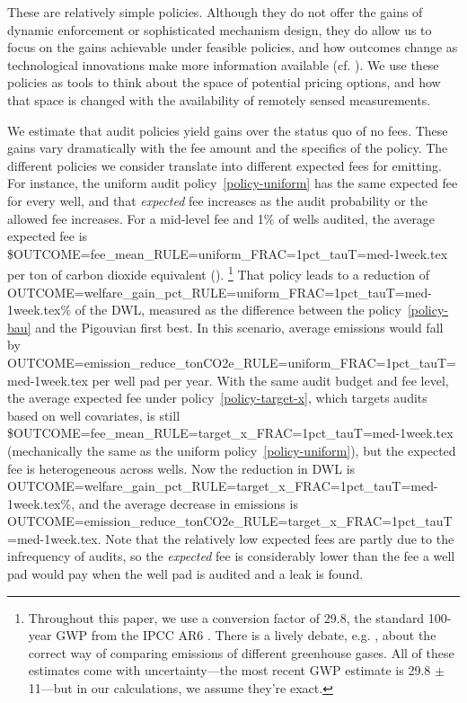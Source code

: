 \documentclass[12pt,oneside,letterpaper]{article}
\theoremstyle{definition}
\begin{document}
\begin{refsection}
These are relatively simple policies.
Although they do not offer the gains of dynamic enforcement or sophisticated mechanism design, they do allow us to focus on the gains achievable under
feasible policies, and how outcomes change as technological innovations make more information available
(cf.
\cite{%
Blundell/Gowrisankaran/Langer:2020,
Cicala/Hemous/Olsen:2019,
Oestreich:2017,
}).
We use these policies as tools to think about the space of potential pricing options, and how that space is changed with the availability of remotely sensed measurements.


We estimate that audit policies yield gains over the status quo of no fees.
These gains vary dramatically with the fee amount and the specifics of the policy.
The different policies we consider translate into different expected fees for emitting.
For instance, the uniform audit policy~\ref{policy-uniform} has the same expected fee for every well, and that \textit{expected} fee increases as the audit probability or the allowed fee increases.
For a mid-level fee and 1\% of wells audited, the average expected fee is
\${OUTCOME=fee_mean_RULE=uniform_FRAC=1pct_tauT=med-1week.tex} per ton of carbon dioxide equivalent ().%
\footnote{%
\label{fn:gwp}
Throughout this paper, we use a  conversion factor of 29.8, the standard 100-year \gls{GWP} from the \gls{IPCC} AR6 \parencite{ipcc_ar6_methane_gwp}.
There is a lively debate, e.g. \textcite{Allen/Shine/Fuglestvedt/Millar/Cain/Frame/Macey:2018}, about the correct way of comparing emissions of different greenhouse gases.
All of these estimates come with uncertainty---the most recent \gls{GWP} estimate is 29.8 \(\pm\) 11---but in our calculations, we assume they're exact.
}
That policy leads to a reduction of
{OUTCOME=welfare_gain_pct_RULE=uniform_FRAC=1pct_tauT=med-1week.tex}\%
of the \gls{DWL}, measured as the difference between the policy~\ref{policy-bau} and the Pigouvian first best.
In this scenario, average emissions would fall by
{OUTCOME=emission_reduce_tonCO2e_RULE=uniform_FRAC=1pct_tauT=med-1week.tex}
 per well pad per year.
With the same audit budget and fee level, the average expected fee under policy~\ref{policy-target-x}, which targets audits based on well covariates, is still
\${OUTCOME=fee_mean_RULE=target_x_FRAC=1pct_tauT=med-1week.tex} (mechanically the same as the uniform policy~\ref{policy-uniform}), but the expected fee is heterogeneous across wells.
Now the reduction in \gls{DWL} is
{OUTCOME=welfare_gain_pct_RULE=target_x_FRAC=1pct_tauT=med-1week.tex}\%,
and the average decrease in emissions is
{OUTCOME=emission_reduce_tonCO2e_RULE=target_x_FRAC=1pct_tauT=med-1week.tex}.
Note that the relatively low expected fees are partly due to the infrequency of audits, so the \emph{expected} fee is considerably lower than the fee a well pad would pay when the well pad is audited and a leak is found.


\end{refsection}
\end{document}
